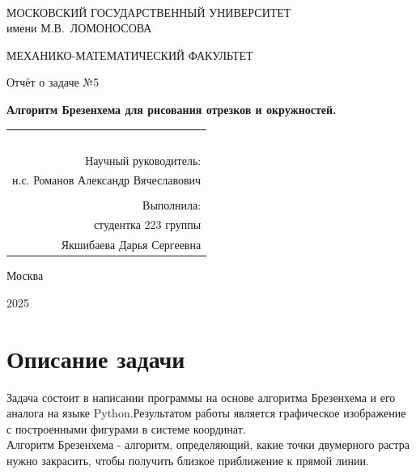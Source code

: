 \documentclass[a4paper, 12pt]{article}
\begin{document}
{\fontsize{14pt}{18}\selectfont
  
  \thispagestyle{empty}
  \begin{center}
		
		\vfill\vfill \ \\ {%
			МОСКОВСКИЙ ГОСУДАРСТВЕННЫЙ УНИВЕРСИТЕТ \\
			имени М.В.~ЛОМОНОСОВА
			
			\medskip
			
			МЕХАНИКО-МАТЕМАТИЧЕСКИЙ ФАКУЛЬТЕТ


		}



{%
	\vfill\vfill\vfill\vfill\vfill\vfill\vfill {%
   
		Отчёт о задаче №5
		
	}
		
		
		\vfill{\Large
        
			\textbf{Алгоритм Брезенхема для рисования отрезков и окружностей.} 
		}
		
			

			\vfill
			\begin{flushright}
				\begin{tabular}{r}
                \\
                \\
                \\
                \\
                \\
                \\
                        Научный руководитель:\\
н.с. Романов Александр Вячеславович\\
                \\
					Выполнила:\\
студентка 223 группы \\
Якшибаева Дарья Сергеевна
					
				\end{tabular}
			\end{flushright}
			
		}
		
		\vfill\vfill\vfill\vfill 
		
		Москва
		
		 2025
	\end{center}
}

    \newpage
    \tableofcontents
    \fontsize{14pt}{20pt}\selectfont
    \newpage
\pagestyle{plain}

\section{Описание задачи}
 Задача состоит в написании программы на основе алгоритма Брезенхема и его аналога на языке Python.Результатом работы является графическое изображение с построенными фигурами в системе координат.\\
Алгоритм Брезенхема - алгоритм, определяющий, какие точки двумерного растра нужно закрасить, чтобы получить близкое приближение к прямой линии.
\end{document}

